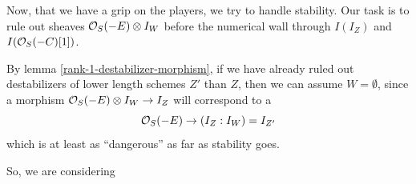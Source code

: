 \documentclass[12pt]{article}
\begin{document}
Now, that we have a grip on the players, we try to handle stability. Our task is to rule out sheaves $\mathcal{O}_S(-E)\otimes I_W$ before the numerical wall through $I(I_Z)$ and $I(\mathcal{O}_S(-C)[1])$.

By lemma \ref{rank-1-destabilizer-morphism}, if we have already ruled out destabilizers of lower length schemes $Z'$ than $Z$, then we can assume $W=\emptyset$, since a morphism $\mathcal{O}_S(-E)\otimes I_W \to I_Z$ will correspond to a
\[\mathcal{O}_S(-E) \to (I_Z:I_W)=I_{Z'}\]
which is at least as ``dangerous'' as far as stability goes.

So, we are considering



\printbibliography
\end{document}
